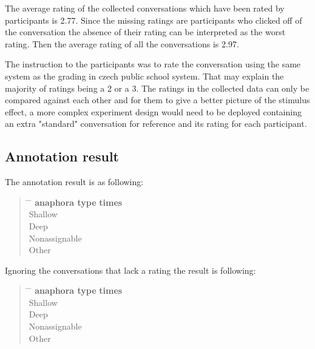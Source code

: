 The average rating of the collected conversations
which have been rated by participants is 2.77.
Since the missing ratings are participants who clicked off of the conversation
the absence of their rating can be interpreted as the worst rating.
Then the average rating of all the conversations is 2.97.

The instruction to the participants was to rate the conversation
using the same system as the grading in czech public school system.
That may explain the majority of ratings being a 2 or a 3.
The ratings in the collected data can only be compared against each other and
for them to give a better picture of the stimulus effect,
a more complex experiment design would need to be deployed
containing an extra "standard" conversation for reference and its rating for each participant.

\subsection{Annotation result}

The annotation result is as following:

\begin{quote}
\begin{tabbing}
\hspace{4cm} \= \hspace{4cm} \= \kill %
\textbf{anaphora type} \> \textbf{times} \\
Shallow  \\
Deep  \\
Nonassignable  \\
Other 
\end{tabbing}
\end{quote}

Ignoring the conversations that lack a rating the result is following:

\begin{quote}
\begin{tabbing}
\hspace{4cm} \= \hspace{4cm} \= \kill %
\textbf{anaphora type} \> \textbf{times} \\
Shallow  \\
Deep  \\
Nonassignable  \\
Other 
\end{tabbing}
\end{quote}


